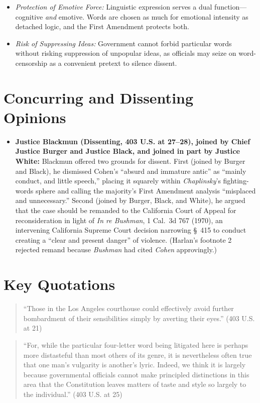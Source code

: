 \documentclass[12pt]{article}
\begin{document}
\begin{enumerate}
\begin{itemize}
    \item \textit{Protection of Emotive Force:} Linguistic expression serves a dual function---cognitive \emph{and} emotive. Words are chosen as much for emotional intensity as detached logic, and the First Amendment protects both.
    \item \textit{Risk of Suppressing Ideas:} Government cannot forbid particular words without risking suppression of unpopular ideas, as officials may seize on word-censorship as a convenient pretext to silence dissent.
  \end{itemize}
\end{enumerate}

\section{Concurring and Dissenting Opinions}
\begin{itemize}
  \item \textbf{Justice Blackmun (Dissenting, 403 U.S. at 27--28), joined by Chief Justice Burger and Justice Black, and joined in part by Justice White:} Blackmun offered two grounds for dissent. First (joined by Burger and Black), he dismissed Cohen's ``absurd and immature antic'' as ``mainly conduct, and little speech,'' placing it squarely within \textit{Chaplinsky}'s fighting-words sphere and calling the majority's First Amendment analysis ``misplaced and unnecessary.'' Second (joined by Burger, Black, and White), he argued that the case should be remanded to the California Court of Appeal for reconsideration in light of \textit{In re Bushman}, 1 Cal.\ 3d 767 (1970), an intervening California Supreme Court decision narrowing \S~415 to conduct creating a ``clear and present danger'' of violence. (Harlan's footnote 2 rejected remand because \textit{Bushman} had cited \textit{Cohen} approvingly.)
\end{itemize}

\section{Key Quotations}
\begin{quote}
``Those in the Los Angeles courthouse could effectively avoid further bombardment of their sensibilities simply by averting their eyes.'' (403 U.S. at 21)
\end{quote}

\begin{quote}
``For, while the particular four-letter word being litigated here is perhaps more distasteful than most others of its genre, it is nevertheless often true that one man's vulgarity is another's lyric. Indeed, we think it is largely because governmental officials cannot make principled distinctions in this area that the Constitution leaves matters of taste and style so largely to the individual.'' (403 U.S. at 25)
\end{quote}
\end{document}
